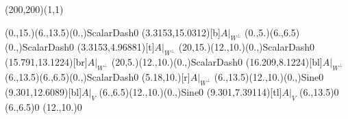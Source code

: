 \unitlength=1bp%

\begin{feynartspicture}(200,200)(1,1)

\FADiagram{}
\FAProp(0.,15.)(6.,13.5)(0.,){ScalarDash}{0}
\FALabel(3.3153,15.0312)[b]{$A|_{W^\perp}$}
\FAProp(0.,5.)(6.,6.5)(0.,){ScalarDash}{0}
\FALabel(3.3153,4.96881)[t]{$A|_{W^\perp}$}
\FAProp(20,15.)(12.,10.)(0.,){ScalarDash}{0}
\FALabel(15.791,13.1224)[br]{$A|_{W^\perp}$}
\FAProp(20,5.)(12.,10.)(0.,){ScalarDash}{0}
\FALabel(16.209,8.1224)[bl]{$A|_{W^\perp}$}
\FAProp(6.,13.5)(6.,6.5)(0.,){ScalarDash}{0}
\FALabel(5.18,10.)[r]{$A|_{W^\perp}$}
\FAProp(6.,13.5)(12.,10.)(0.,){Sine}{0}
\FALabel(9.301,12.6089)[bl]{$A|_V$}
\FAProp(6.,6.5)(12.,10.)(0.,){Sine}{0}
\FALabel(9.301,7.39114)[tl]{$A|_V$}
\FAVert(6.,13.5){0}
\FAVert(6.,6.5){0}
\FAVert(12.,10.){0}
\end{feynartspicture}

